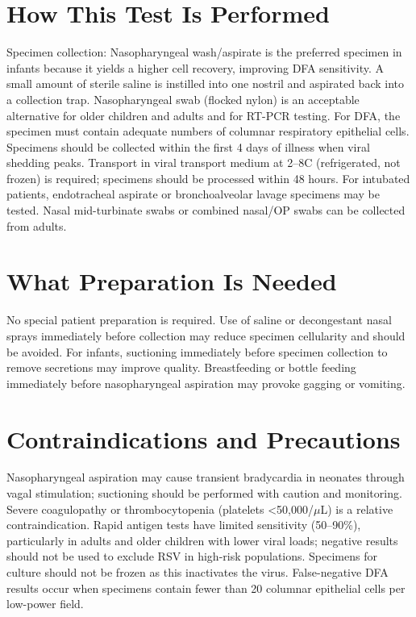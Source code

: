 \section*{How This Test Is Performed}
Specimen collection: Nasopharyngeal wash/aspirate is the preferred specimen in infants because it yields a higher cell recovery, improving DFA sensitivity. A small amount of sterile saline is instilled into one nostril and aspirated back into a collection trap. Nasopharyngeal swab (flocked nylon) is an acceptable alternative for older children and adults and for RT-PCR testing. For DFA, the specimen must contain adequate numbers of columnar respiratory epithelial cells. Specimens should be collected within the first 4 days of illness when viral shedding peaks. Transport in viral transport medium at 2--8\textdegree{}C (refrigerated, not frozen) is required; specimens should be processed within 48 hours. For intubated patients, endotracheal aspirate or bronchoalveolar lavage specimens may be tested. Nasal mid-turbinate swabs or combined nasal/OP swabs can be collected from adults.

\section*{What Preparation Is Needed}
No special patient preparation is required. Use of saline or decongestant nasal sprays immediately before collection may reduce specimen cellularity and should be avoided. For infants, suctioning immediately before specimen collection to remove secretions may improve quality. Breastfeeding or bottle feeding immediately before nasopharyngeal aspiration may provoke gagging or vomiting.

\section*{Contraindications and Precautions}
Nasopharyngeal aspiration may cause transient bradycardia in neonates through vagal stimulation; suctioning should be performed with caution and monitoring. Severe coagulopathy or thrombocytopenia (platelets <50,000/$\mu$L) is a relative contraindication. Rapid antigen tests have limited sensitivity (50--90\%), particularly in adults and older children with lower viral loads; negative results should not be used to exclude RSV in high-risk populations. Specimens for culture should not be frozen as this inactivates the virus. False-negative DFA results occur when specimens contain fewer than 20 columnar epithelial cells per low-power field.

